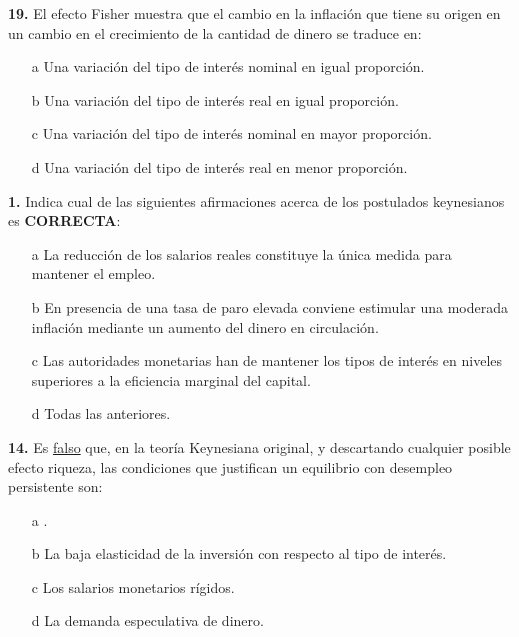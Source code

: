 \documentclass{nuevotema}
\begin{document}
\textbf{19.} El efecto Fisher muestra que el cambio en la inflación que tiene su origen en un cambio en el crecimiento de la cantidad de dinero se traduce en:

\begin{enumerate}
	\item[a] Una variación del tipo de interés nominal en igual proporción.
	\item[b] Una variación del tipo de interés real en igual proporción.
	\item[c] Una variación del tipo de interés nominal en mayor proporción.
	\item[d] Una variación del tipo de interés real en menor proporción.
\end{enumerate}


\textbf{1.} Indica cual de las siguientes afirmaciones acerca de los postulados keynesianos es \textbf{CORRECTA}:

\begin{enumerate}
	\item[a] La reducción de los salarios reales constituye la única medida para mantener el empleo.
	\item[b] En presencia de una tasa de paro elevada conviene estimular una moderada inflación mediante un aumento del dinero en circulación.
	\item[c] Las autoridades monetarias han de mantener los tipos de interés en niveles superiores a la eficiencia marginal del capital.
	\item[d] Todas las anteriores.
\end{enumerate}


\textbf{14.} Es \underline{falso} que, en la teoría Keynesiana original, y descartando cualquier posible efecto riqueza, las condiciones que justifican un equilibrio con desempleo persistente son:

\begin{enumerate}
	\item[a] .
	\item[b] La baja elasticidad de la inversión con respecto al tipo de interés.
	\item[c] Los salarios monetarios rígidos.
	\item[d] La demanda especulativa de dinero.
\end{enumerate}

\end{document}
